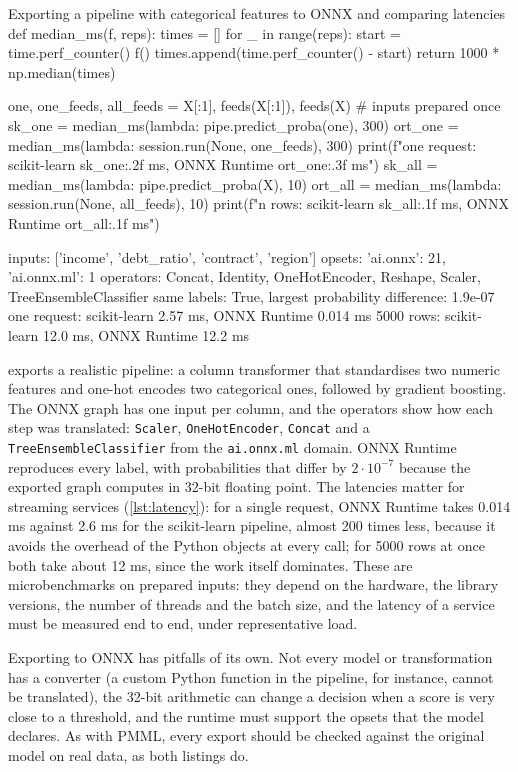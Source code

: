 \begin{pylisting}[label={lst:onnx}]{Exporting a pipeline with categorical features to ONNX and comparing latencies}
def median_ms(f, reps):
    times = []
    for _ in range(reps):
        start = time.perf_counter()
        f()
        times.append(time.perf_counter() - start)
    return 1000 * np.median(times)

one, one_feeds, all_feeds = X[:1], feeds(X[:1]), feeds(X)   # inputs prepared once
sk_one = median_ms(lambda: pipe.predict_proba(one), 300)
ort_one = median_ms(lambda: session.run(None, one_feeds), 300)
print(f"one request: scikit-learn {sk_one:.2f} ms, ONNX Runtime {ort_one:.3f} ms")
sk_all = median_ms(lambda: pipe.predict_proba(X), 10)
ort_all = median_ms(lambda: session.run(None, all_feeds), 10)
print(f"{n} rows:   scikit-learn {sk_all:.1f} ms, ONNX Runtime {ort_all:.1f} ms")
\end{pylisting}
\begin{pyoutput}
inputs: ['income', 'debt_ratio', 'contract', 'region']
opsets: {'ai.onnx': 21, 'ai.onnx.ml': 1}
operators: Concat, Identity, OneHotEncoder, Reshape, Scaler, TreeEnsembleClassifier
same labels: True, largest probability difference: 1.9e-07
one request: scikit-learn 2.57 ms, ONNX Runtime 0.014 ms
5000 rows:   scikit-learn 12.0 ms, ONNX Runtime 12.2 ms
\end{pyoutput}

 exports a realistic pipeline: a column transformer that standardises two numeric features
and one-hot encodes two categorical ones, followed by gradient boosting. The ONNX graph has one input per
column, and the operators show how each step was translated: \texttt{Scaler}, \texttt{OneHotEncoder},
\texttt{Concat} and a \texttt{TreeEnsembleClassifier} from the \texttt{ai.onnx.ml} domain. ONNX Runtime
reproduces every label, with probabilities that differ by $2\cdot10^{-7}$ because the exported graph
computes in 32-bit floating point. The latencies matter for streaming services
(\cref{lst:latency}): for a single request, ONNX Runtime takes 0.014 ms against 2.6 ms for the
scikit-learn pipeline, almost 200 times less, because it avoids the overhead of the Python objects at every
call; for 5000 rows at once both take about 12 ms, since the work itself dominates. These are microbenchmarks on
prepared inputs: they depend on the hardware, the library versions, the number of threads and the batch
size, and the latency of a service must be measured end to end, under representative load.

Exporting to ONNX has pitfalls of its own. Not every model or transformation has a converter (a custom
Python function in the pipeline, for instance, cannot be translated), the 32-bit arithmetic can change a
decision when a score is very close to a threshold, and the runtime must support the opsets that the model
declares. As with PMML, every export should be checked against the original model on real data, as both
listings do.

